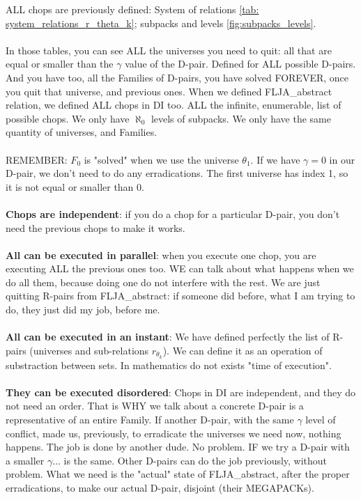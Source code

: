 	\noindent
	ALL chops are previously defined: System of relations {\ref{tab: system_relations_r_theta_k}; subpacks and levels {\ref{fig:subpacks_levels}}.\\\\
	In those tables, you can see ALL the universes you need to quit: all that are equal or smaller than the $\gamma$ value of the D-pair. Defined for ALL possible D-pairs. And you have too, all the Families of D-pairs, you have solved FOREVER, once you quit that universe, and previous ones. When we defined FLJA\_abstract relation, we defined ALL chops in DI too. ALL the infinite, enumerable, list of possible chops. We only have $\aleph_{0}$ levels of subpacks. We only have the same quantity of universes, and Families.\\\\
	REMEMBER: $F_{0}$ is "solved" when we use the universe $\theta_{1}$. If we have $\gamma=0$ in our D-pair, we don't need to do any erradications. The first universe has index 1, so it is not equal or smaller than 0.
	\\\\
	
	\noindent
	\textbf{Chops are independent}: if you do a chop for a particular D-pair, you don't need the previous chops to make it works.\\\\
	\textbf{All can be executed in parallel}: when you execute one chop, you are executing ALL the previous ones too. WE can talk about what happens when we do all them, because doing one do not interfere with the rest. We are just quitting R-pairs from FLJA\_abstract: if someone did before, what I am trying to do, they just did my job, before me.\\\\
	\textbf{All can be executed in an instant}: We have defined perfectly the list of R-pairs (universes and sub-relations $r_{\theta_k}$). We can define it as an operation of substraction between sets. In mathematics do not exists "time of execution".\\\\
	\textbf{They can be executed disordered}: Chops in DI are independent, and they do not need an order. That is WHY we talk about a concrete D-pair is a representative of an entire Family. If another D-pair, with the same $\gamma$ level of conflict, made us, previously, to erradicate the universes we need now, nothing happens. The job is done by another dude. No problem. IF we try a D-pair with a smaller $\gamma$... is the same. Other D-pairs can do the job previously, without problem. What we need is the "actual" state of FLJA\_abstract, after the proper erradications, to make our actual D-pair, disjoint (their MEGAPACKs).
	\\\\
	
}
